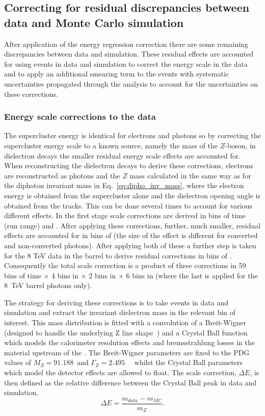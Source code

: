 \subsection{Correcting for residual discrepancies between data and Monte Carlo simulation}
\label{sec:scale_smearing}

After application of the energy regression correction there are some remaining discrepancies between data and \MC simulation. These residual effects are accounted for using \Zee events in data and simulation to correct the energy scale in the data and to apply an additional smearing term to the \MC events with systematic uncertainties propagated through the analysis to account for the uncertainties on these corrections.

\subsubsection{Energy scale corrections to the data}

The supercluster energy is identical for electrons and photons so by correcting the supercluster energy scale to a known source, namely the mass of the $Z$-boson, in dielectron decays the smaller residual energy scale effects are accounted for. When reconstructing the dielectron decays to derive these corrections, electrons are reconstructed as photons and the $Z$ mass calculated in the same way as for the diphoton invariant mass in Eq.~\ref{eq:dipho_inv_mass}, where the electron energy is obtained from the supercluster alone and the dielectron opening angle is obtained from the tracks. This can be done several times to account for various different effects. In the first stage scale corrections are derived in bins of time (run range) and \eta. After applying these corrections, further, much smaller, residual effects are accounted for in bins of \rnine (the size of the effect is different for converted and non-converted photons). After applying both of these a further step is taken for the 8 TeV data in the barrel to derive residual corrections in bins of \ET. Consequently the total scale correction is a product of three corrections in 59 bins of time $\times$ 4 bins in \eta $\times$ 2 bins in \rnine $\times$ 6 bins in \ET (where the last is applied for the 8~TeV barrel photons only).

The strategy for deriving these corrections is to take \Zee events in data and \MC simulation and extract the invariant dielectron mass in the relevant bin of interest. This mass distribution is fitted with a convolution of a Breit-Wigner (designed to handle the underlying Z line shape~\cite{pdg}) and a Crystal Ball function which models the calorimeter resolution effects and bremsstrahlung losses in the material upstream of the \ECAL. The Breit-Wigner parameters are fixed to the PDG values of $M_{Z}=91.188$~\GeV and $\Gamma_{Z}=2.495$~\GeV~\cite{pdg} whilst the Crystal Ball parameters which model the detector effects are allowed to float. The scale correction, $\Delta E$, is then defined as the relative difference between the Crystal Ball peak in data and simulation,
\begin{equation}
  \Delta E = \frac{m_{data}-m_{MC}}{m_{Z}}.
\end{equation}
